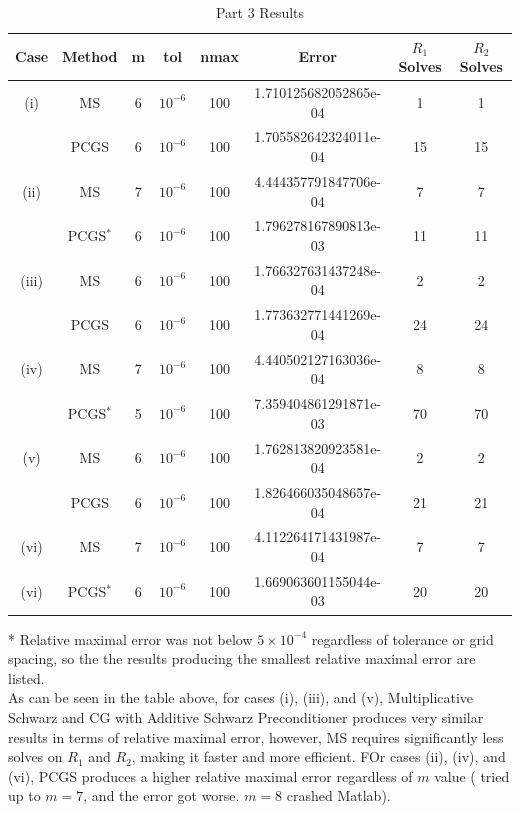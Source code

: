 \documentclass[12pt]{article}
\begin{document}
\begin{table}[H]
\centering
\renewcommand{\arraystretch}{1.3}
\begin{small}
\begin{tabular}{| c || c | c | c | c | c | c | c |}
\hline
\textbf{Case} & \textbf{Method} & \textbf{m} & \textbf{tol} & \textbf{nmax} &  \textbf{Error} & \textbf{$R_1$ Solves} & \textbf{$R_2$ Solves}\\
\hline 
\hline
(i)  & MS  & 6  & $10^{-6}$  & 100  & 1.710125682052865e-04  &  1 &  1 \\
  & PCGS  & 6  &  $10^{-6}$ & 100  & 1.705582642324011e-04  &  15 &  15 \\
\hline
(ii)  & MS  &  7 & $10^{-6}$  & 100  & 4.444357791847706e-04  & 7  &  7 \\
  & PCGS$^*$  & 6  &  $10^{-6}$ & 100  & 1.796278167890813e-03  & 11  & 11  \\
\hline
(iii)  & MS  & 6  & $10^{-6}$  & 100  & 1.766327631437248e-04  & 2  &  2 \\
  & PCGS  & 6  & $10^{-6}$  & 100  & 1.773632771441269e-04  & 24  & 24  \\
\hline
(iv)  &  MS & 7  & $10^{-6}$  & 100  & 4.440502127163036e-04  & 8  &  8 \\
  & PCGS$^*$  &  5 &  $10^{-6}$ & 100  & 7.359404861291871e-03  & 70  & 70  \\
\hline
(v)  & MS  & 6 & $10^{-6}$  & 100  & 1.762813820923581e-04  & 2  & 2  \\
  &  PCGS & 6  & $10^{-6}$  & 100  & 1.826466035048657e-04  & 21  & 21  \\
\hline
(vi)  & MS  &  7 &  $10^{-6}$ & 100  & 4.112264171431987e-04  & 7  & 7  \\
(vi)  & PCGS$^*$  &  6 & $10^{-6}$  & 100  &  1.669063601155044e-03 &  20 &  20 \\

\hline
\end{tabular}
\end{small}
\caption{Part 3 Results}
\end{table} 

* Relative maximal error was not below $5\times 10^{-4}$ regardless of tolerance or grid spacing, so the the results producing the smallest relative maximal error are listed.\\

As can be seen in the table above, for cases (i), (iii), and (v), Multiplicative Schwarz and CG with Additive Schwarz Preconditioner produces very similar results in terms of relative maximal error, however, MS requires significantly less solves on $R_1$ and $R_2$, making it faster and more efficient.  FOr cases (ii), (iv), and (vi), PCGS produces a higher relative maximal error regardless of $m$ value ( tried up to $m=7$, and the error got worse.  $m=8$ crashed Matlab).\\
\end{document}
